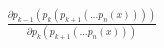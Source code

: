 \documentclass[preview]{standalone}
\begin{document}
\begin{align*}
\frac{\partial p_{k-1}(p_k(p_{k+1}(\ldots p_n(x))))}{\partial p_k(p_{k+1}(\ldots p_n(x)))}
\end{align*}
\end{document}
